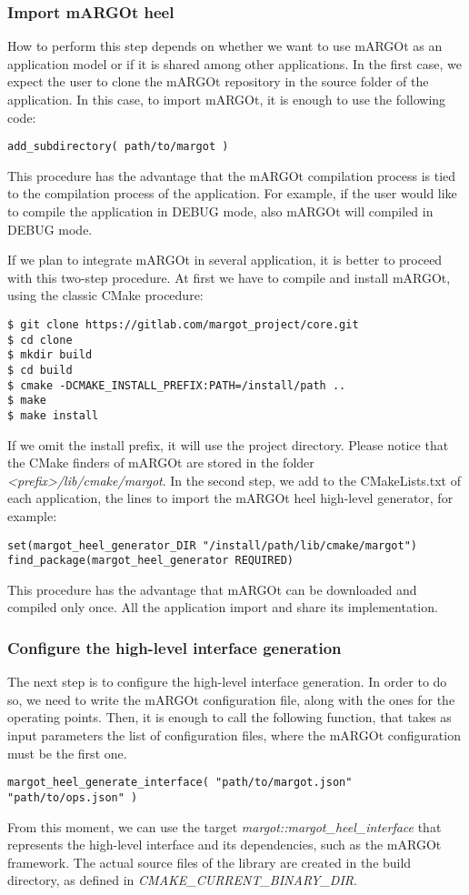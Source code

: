 \subsubsection{Import mARGOt heel}

How to perform this step depends on whether	we want to use mARGOt as an application model or if it is shared among other applications.
In the first case, we expect the user to clone the mARGOt repository in the source folder of the application.
In this case, to import mARGOt, it is enough to use the following code:
\begin{lstlisting}
add_subdirectory( path/to/margot )
\end{lstlisting}
This procedure has the advantage that the mARGOt compilation process is tied to the compilation process of the application.
For example, if the user would like to compile the application in DEBUG mode, also mARGOt will compiled in DEBUG mode.

If we plan to integrate mARGOt in several application, it is better to proceed with this two-step procedure.
At first we have to compile and install mARGOt, using the classic CMake procedure:
\begin{lstlisting}
$ git clone https://gitlab.com/margot_project/core.git
$ cd clone
$ mkdir build
$ cd build
$ cmake -DCMAKE_INSTALL_PREFIX:PATH=/install/path ..
$ make
$ make install
\end{lstlisting}
If we omit the install prefix, it will use the project directory.
Please notice that the CMake finders of mARGOt are stored in the folder \textit{<prefix>/lib/cmake/margot}.
In the second step, we add to the CMakeLists.txt of each application, the lines to import the mARGOt heel high-level generator, for example:
\begin{lstlisting}
set(margot_heel_generator_DIR "/install/path/lib/cmake/margot")
find_package(margot_heel_generator REQUIRED)
\end{lstlisting}
This procedure has the advantage that mARGOt can be downloaded and compiled only once.
All the application import and share its implementation.

\subsubsection{Configure the high-level interface generation}

The next step is to configure the high-level interface generation.
In order to do so, we need to write the mARGOt configuration file, along with the ones for the operating points.
Then, it is enough to call the following function, that takes as input parameters the list of configuration files, where the mARGOt configuration must be the first one.
\begin{lstlisting}
margot_heel_generate_interface( "path/to/margot.json" "path/to/ops.json" )
\end{lstlisting}
From this moment, we can use the target \textit{margot::margot\_heel\_interface} that represents the high-level interface and its dependencies, such as the mARGOt framework.
The actual source files of the library are created in the build directory, as defined in \textit{CMAKE\_CURRENT\_BINARY\_DIR}.


